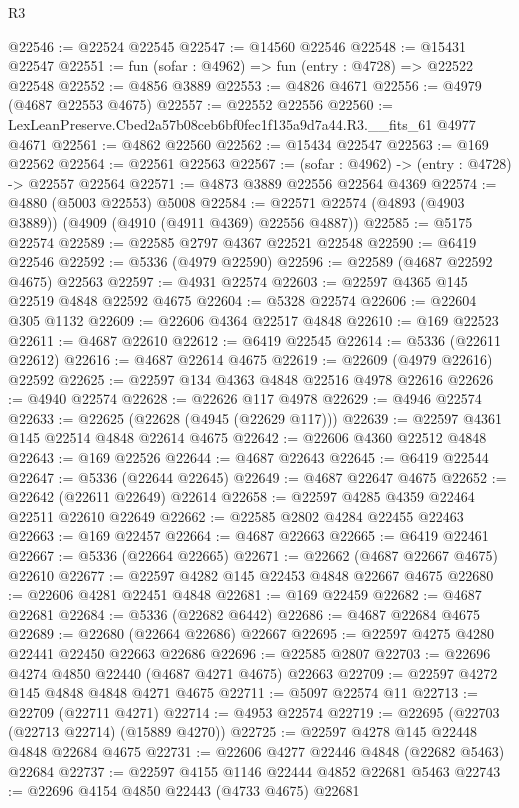 \begin{lexlean}{R3}
\begin{coremodule}
@22546 := @22524 @22545
@22547 := @14560 @22546
@22548 := @15431 @22547
@22551 := fun (sofar : @4962) => fun (entry : @4728) => @22522 @22548
@22552 := @4856 @3889
@22553 := @4826 @4671
@22556 := @4979 (@4687 @22553 @4675)
@22557 := @22552 @22556
@22560 := LexLeanPreserve.Cbed2a57b08ceb6bf0fec1f135a9d7a44.R3.__fits_61 @4977 @4671
@22561 := @4862 @22560
@22562 := @15434 @22547
@22563 := @169 @22562
@22564 := @22561 @22563
@22567 := (sofar : @4962) -> (entry : @4728) -> @22557 @22564
@22571 := @4873 @3889 @22556 @22564 @4369
@22574 := @4880 (@5003 @22553) @5008
@22584 := @22571 @22574 (@4893 (@4903 @3889)) (@4909 (@4910 (@4911 @4369) @22556 @4887))
@22585 := @5175 @22574
@22589 := @22585 @2797 @4367 @22521 @22548
@22590 := @6419 @22546
@22592 := @5336 (@4979 @22590)
@22596 := @22589 (@4687 @22592 @4675) @22563
@22597 := @4931 @22574
@22603 := @22597 @4365 @145 @22519 @4848 @22592 @4675
@22604 := @5328 @22574
@22606 := @22604 @305 @1132
@22609 := @22606 @4364 @22517 @4848
@22610 := @169 @22523
@22611 := @4687 @22610
@22612 := @6419 @22545
@22614 := @5336 (@22611 @22612)
@22616 := @4687 @22614 @4675
@22619 := @22609 (@4979 @22616) @22592
@22625 := @22597 @134 @4363 @4848 @22516 @4978 @22616
@22626 := @4940 @22574
@22628 := @22626 @117 @4978
@22629 := @4946 @22574
@22633 := @22625 (@22628 (@4945 (@22629 @117)))
@22639 := @22597 @4361 @145 @22514 @4848 @22614 @4675
@22642 := @22606 @4360 @22512 @4848
@22643 := @169 @22526
@22644 := @4687 @22643
@22645 := @6419 @22544
@22647 := @5336 (@22644 @22645)
@22649 := @4687 @22647 @4675
@22652 := @22642 (@22611 @22649) @22614
@22658 := @22597 @4285 @4359 @22464 @22511 @22610 @22649
@22662 := @22585 @2802 @4284 @22455 @22463
@22663 := @169 @22457
@22664 := @4687 @22663
@22665 := @6419 @22461
@22667 := @5336 (@22664 @22665)
@22671 := @22662 (@4687 @22667 @4675) @22610
@22677 := @22597 @4282 @145 @22453 @4848 @22667 @4675
@22680 := @22606 @4281 @22451 @4848
@22681 := @169 @22459
@22682 := @4687 @22681
@22684 := @5336 (@22682 @6442)
@22686 := @4687 @22684 @4675
@22689 := @22680 (@22664 @22686) @22667
@22695 := @22597 @4275 @4280 @22441 @22450 @22663 @22686
@22696 := @22585 @2807
@22703 := @22696 @4274 @4850 @22440 (@4687 @4271 @4675) @22663
@22709 := @22597 @4272 @145 @4848 @4848 @4271 @4675
@22711 := @5097 @22574 @11
@22713 := @22709 (@22711 @4271)
@22714 := @4953 @22574
@22719 := @22695 (@22703 (@22713 @22714) (@15889 @4270))
@22725 := @22597 @4278 @145 @22448 @4848 @22684 @4675
@22731 := @22606 @4277 @22446 @4848 (@22682 @5463) @22684
@22737 := @22597 @4155 @1146 @22444 @4852 @22681 @5463
@22743 := @22696 @4154 @4850 @22443 (@4733 @4675) @22681

\end{coremodule}
\end{lexlean}
